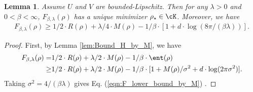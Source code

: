 \documentclass[11pt]{article}
\newtheorem{lemma}{Lemma}
\begin{document}
\begin{lemma}\label{lem:Free_Energy_Unique_Minimum}
Assume $U$ and $V$ are bounded-Lipschitz. Then for any $\lambda > 0$ and $0 < \beta < \infty$, $F_{\beta, \lambda}(\rho)$ has a unique minimizer $\rho_\star \in \cK$. Moreover, we have
\begin{align}\label{eqn:F_lower_bound_by_M}
F_{\beta, \lambda}(\rho) \ge 1/2 \cdot R(\rho) + \lambda/4 \cdot M(\rho) - 1/\beta \cdot [1 + d\cdot \log(8\pi/(\beta \lambda))].
\end{align}
\end{lemma}

\begin{proof}
%
%

First, by Lemma \ref{lem:Bound_H_by_M}, we have 
\[
\begin{aligned}
F_{\beta, \lambda}(\rho) =& 1/2 \cdot R(\rho) + \lambda/2 \cdot M(\rho) - 1/\beta \cdot \ent(\rho)\\
\ge& 1/2 \cdot R(\rho) + \lambda/2 \cdot M(\rho) - 1/\beta \cdot [1 + M(\rho) / \sigma^2 + d \cdot \log(2\pi \sigma^2)].
\end{aligned}
\]
Taking $\sigma^2 = 4/(\beta \lambda)$ gives Eq. (\ref{eqn:F_lower_bound_by_M}) . 


\end{proof}
\end{document}
